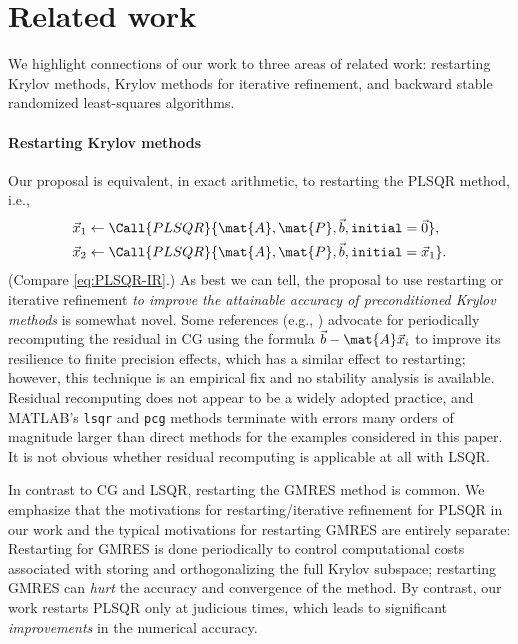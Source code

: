 \section{Related work}
We highlight connections of our work to three areas of related work: restarting Krylov methods, Krylov methods for iterative refinement, and backward stable randomized least-squares algorithms.

\paragraph{Restarting Krylov methods}
Our proposal is equivalent, in exact arithmetic, to restarting the PLSQR method, i.e.,
%
\begin{equation} \label{eq:LSQR-restarting}
    \begin{split}
    \vec{x}_1 &\gets \Call{PLSQR}{\mat{A},\mat{P},\vec{b},\texttt{initial}=\vec{0}}, \\
    \vec{x}_2 &\gets \Call{PLSQR}{\mat{A},\mat{P},\vec{b},\texttt{initial}=\vec{x}_1}.
    \end{split}
\end{equation}
%
(Compare \cref{eq:PLSQR-IR}.)
As best we can tell, the proposal to use restarting or iterative refinement \emph{to improve the attainable accuracy of preconditioned Krylov methods} is somewhat novel.
Some references (e.g., \cite[p.~49]{She94a}) advocate for periodically recomputing the residual in CG using the formula $\vec{b} - \mat{A}\vec{x}_i$ to improve its resilience to finite precision effects, which has a similar effect to restarting; however, this technique is an empirical fix and no stability analysis is available.
Residual recomputing does not appear to be a widely adopted practice, and MATLAB's \texttt{lsqr} and \texttt{pcg} methods terminate with errors many orders of magnitude larger than direct methods for the examples considered in this paper.
It is not obvious whether residual recomputing is applicable at all with LSQR.

In contrast to CG and LSQR, restarting the GMRES method is common.
We emphasize that the motivations for restarting/iterative refinement for PLSQR in our work and the typical motivations for restarting GMRES are entirely separate: Restarting for GMRES is done periodically to control computational costs associated with storing and orthogonalizing the full Krylov subspace; restarting GMRES can \emph{hurt} the accuracy and convergence of the method.
By contrast, our work restarts PLSQR only at judicious times, which leads to significant \emph{improvements} in the numerical accuracy. 

